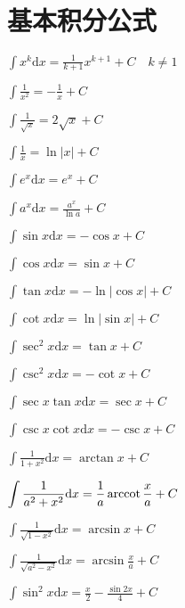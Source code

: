 \section{基本积分公式}

\begin{multicols}{2}
    \begin{spacing}{\hangju}
        \noindent $\displaystyle \int{x^k}\mathrm{d}x = \frac{1}{k+1}x^{k+1} + C \quad k\neq1$

        \noindent $\displaystyle \int{\frac{1}{x^2}} = -\frac{1}{x} + C$

        \noindent $\displaystyle \int{\frac{1}{\sqrt{x}}} = 2\sqrt{x} + C$

        \noindent $\displaystyle \int{\frac{1}{x}} = \ln{\left| x \right|} + C$

        \noindent $\displaystyle \int{e^x}\mathrm{d}x = e^x + C$

        \noindent $\displaystyle \int{a^x}\mathrm{d}x = \frac{a^x}{\ln{a}} + C$

        \noindent $\displaystyle \int{\sin{x}}\mathrm{d}x = -\cos{x} + C$

        \noindent $\displaystyle \int{\cos{x}}\mathrm{d}x = \sin{x} + C$

        \noindent $\displaystyle \int{\tan{x}}\mathrm{d}x = -\ln{\left| \cos{x} \right|} + C$

        \noindent $\displaystyle \int{\cot{x}}\mathrm{d}x = \ln{\left| \sin{x} \right|} + C$

        \noindent $\displaystyle \int{\sec^2{x}}\mathrm{d}x = \tan{x} + C$

        \noindent $\displaystyle \int{\csc^2{x}}\mathrm{d}x = -\cot{x} + C$

        \noindent $\displaystyle \int{\sec{x}\tan{x}}\mathrm{d}x = \sec{x} + C$

        \noindent $\displaystyle \int{\csc{x}\cot{x}}\mathrm{d}x = -\csc{x} + C$

        \noindent $\displaystyle \int{\frac{1}{1 + x^2}}\mathrm{d}x = \arctan{x} + C$

        \noindent $\displaystyle \int{\frac{1}{a^2 + x^2}}\mathrm{d}x = \frac{1}{a}\operatorname{arccot}{\frac{x}{a}} + C$

        \noindent $\displaystyle \int{\frac{1}{\sqrt{1 - x^2}}}\mathrm{d}x = \arcsin{x} + C$

        \noindent $\displaystyle \int{\frac{1}{\sqrt{a^2 - x^2}}}\mathrm{d}x = \arcsin{\frac{x}{a}} + C$

        \noindent $\displaystyle \int{\sin^2{x}}\mathrm{d}x = \frac{x}{2} - \frac{\sin{2x}}{4} + C$


\end{spacing}
\end{multicols}
